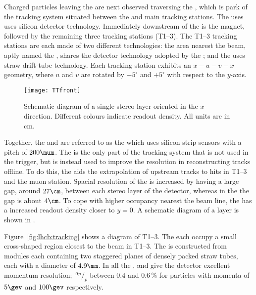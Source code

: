 Charged particles leaving the \velo are next observed traversing the
\ttracker, which is park of the tracking system situated between the \velo and main tracking
stations.
The \ttracker uses uses silicon detector technology.
Immediately downstream of the \ttracker is the \lhcb magnet, followed by the remaining three
tracking stations (T1--3).
The T1--3 tracking stations are each made of two different technologies: the area nearest the beam,
aptly named the \intr, shares the detector technology adopted by the \ttracker;
and the \ot uses straw drift-tube technology.
Each tracking station exhibits an $x-u-v-x$ geometry, where $u$ and $v$ are rotated by $-5^\circ$ and
$+5^\circ$ with respect to the $y$-axis.

\begin{figure}
  \begin{center}
    \texttt{[image: TTfront]}
    \caption[Diagram of the LHCb Tracker Turicensis]
    {
      Schematic diagram of a single stereo \ttracker layer oriented in the $x$-direction.
      Different colours indicate readout density.
      All units are in cm.
    }
    \label{fig:lhcb:tt}
  \end{center}
\end{figure}

Together, the \ttracker and \intr are referred to as the \st which
uses silicon strip sensors with a pitch of $200\mum$.
The \ttracker is the only part of the tracking system that is not used in the trigger, but is
instead used to improve the resolution in reconstructing tracks offline.
To do this, the \ttracker aids the extrapolation of upstream tracks to hits in T1--3 and the muon
station.
Spacial resolution of the \ttracker is increased by having a large gap, around $27\cm$, between
each stereo layer of the detector, whereas in the \intr the gap is about $4\cm$.
To cope with higher occupancy nearest the beam line, the \ttracker has a increased readout density
closer to $y=0$.
A schematic diagram of a \ttracker layer is shown in .

Figure~\ref{fig:lhcb:tracking} shows a diagram of T1--3.
The  each occupy a small cross-shaped region closest to the beam in T1--3.
The \ot is constructed from modules each containing two staggered planes of densely packed straw
tubes, each with a diameter of  $4.9\mm$.
In all the \velo, \st and \ot give the \lhcb detector excellent momentum resolution;
$^{\Delta p}/_p$ between 0.4 and 0.6\,\% for particles with momenta of $5\gev$ and $100\gev$
respectively.

